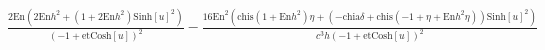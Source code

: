 \documentclass{article}
\begin{document}
\begin{doublespace}
\noindent\(\frac{2 \text{En} \left(2 \text{En} h^2+\left(1+2 \text{En} h^2\right) \text{Sinh}[u]^2\right)}{(-1+\text{et} \text{Cosh}[u])^2}-\frac{16
\text{En}^2 \left(\text{chis} \left(1+\text{En} h^2\right) \eta +\left(-\text{chia} \delta +\text{chis} \left(-1+\eta +\text{En} h^2 \eta \right)\right)
\text{Sinh}[u]^2\right)}{c^3 h (-1+\text{et} \text{Cosh}[u])^2}\)
\end{doublespace}
\end{document}
